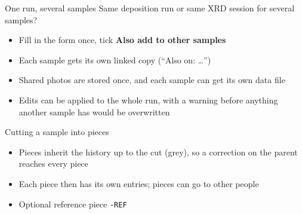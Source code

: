 \documentclass[aspectratio=169,11pt]{beamer}
\newcommand{\ui}[1]{\textsf{\textbf{#1}}}
\newcommand{\sid}[1]{\texttt{#1}}
\begin{document}
\begin{frame}{One run, several samples}
  Same deposition run or same XRD session for several samples?
  \begin{itemize}
    \item Fill in the form once, tick \ui{Also add to other samples}
    \item Each sample gets its own linked copy (``Also on: \ldots'')
    \item Shared photos are stored once, and each sample can get its own data file
    \item Edits can be applied to the whole run, with a warning before
          anything another sample has would be overwritten
  \end{itemize}
\end{frame}

\begin{frame}{Cutting a sample into pieces}
  \centering

  \vspace{0.3cm}
  \raggedright\small
  \begin{itemize}
    \item Pieces \alert{inherit} the history up to the cut (grey), so a
          correction on the parent reaches every piece
    \item Each piece then has its own entries; pieces can go to other people
    \item Optional reference piece \sid{-REF}
  \end{itemize}
\end{frame}
\end{document}
